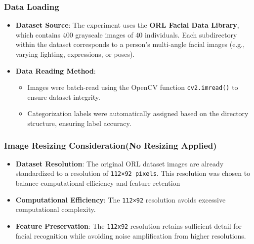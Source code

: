 \documentclass{article}
\begin{document}
	\subsubsection{Data Loading}
	\begin{itemize}
		\item \textbf{Dataset Source}: The experiment uses the \textbf{ORL Facial Data Library}\cite{Samaria1994}, which contains 400 grayscale images of 40 individuals. Each subdirectory within the dataset corresponds to a person's multi-angle facial images (e.g., varying lighting, expressions, or poses).
		
		\item \textbf{Data Reading Method}:
		\begin{itemize}
			\item Images were batch-read using the OpenCV function \texttt{cv2.imread()} to ensure dataset integrity.
			\item Categorization labels were automatically assigned based on the directory structure, ensuring label accuracy.
		\end{itemize}
	\end{itemize}
\subsubsection{Image Resizing Consideration(No Resizing Applied)}
	\begin{itemize}
	\item \textbf{Dataset Resolution}: The original ORL dataset images are already standardized to a resolution of \texttt{112×92 pixels}. This resolution was chosen to balance computational efficiency and feature retention
	\end{itemize}
	\begin{itemize}
		\item \textbf{Computational Efficiency}: The \texttt{112×92} resolution avoids excessive computational complexity.
		\item \textbf{Feature Preservation}: The \texttt{112x92} resolution retains sufficient detail for facial recognition while avoiding noise amplification from higher resolutions.
\end{itemize}
	
\end{document}
